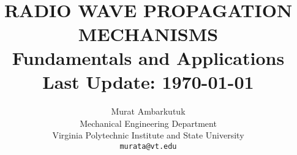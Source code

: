 \title{
    \\ [2.0cm]
    \HRule{0.5pt} \\
    \LARGE \textbf{\uppercase{Radio Wave Propagation Mechanisms}} \\
    \normalsize{Fundamentals and Applications}
    \HRule{2pt} \\ [0.5cm]
    \normalsize{Last Update:} \today \vspace*{5\baselineskip}
}

\author{
    Murat Ambarkutuk \\
    Mechanical Engineering Department \\
    Virginia Polytechnic Institute and State University \\
    \texttt{murata@vt.edu}
}

\maketitle
\thispagestyle{empty}
\pagebreak
